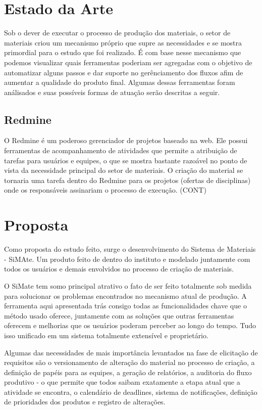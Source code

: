 \section{Estado da Arte}

Sob o dever de executar o processo de produção dos materiais, o setor de materiais criou um mecanismo próprio que supre as necessidades e se mostra primordial para o estudo que foi realizado. É com base nesse mecanismo que podemos visualizar quais ferramentas poderiam ser agregadas com o objetivo de automatizar alguns passos e dar suporte no gerênciamento dos fluxos afim de aumentar a qualidade do produto final. Algumas dessas ferramentas foram análisados e suas possíveis formas de atuação serão descritas a seguir.

\subsection{Redmine}

O Redmine é um poderoso gerenciador de projetos baseado na web. Ele possui ferramentas de acompanhamento de atividades que permite a atribuição de tarefas para usuários e equipes, o que se mostra bastante razoável no ponto de vista da necessidade principal do setor de materiais. O criação do material se tornaria uma tarefa dentro do Redmine para os projetos (ofertas de disciplinas) onde os responsáveis assinariam o processo de execução. (CONT) 

\section{Proposta}

Como proposta do estudo feito, surge o desenvolvimento do Sistema de Materiais - SiMAte. Um produto feito de dentro do instituto e modelado juntamente com todos os usuários e demais envolvidos no processo de criação de materiais.

O SiMate tem somo principal atrativo o fato de ser feito totalmente sob medida para solucionar os problemas encontrados no mecanismo atual de produção. A ferramenta aqui apresentada trás consigo todas as funcionalidades chave que o método usado oferece, juntamente com as soluções que outras ferramentas oferecem e melhorias que os usuários poderam perceber ao longo do tempo. Tudo isso unificado em um sistema totalmente extensível e proprietário.

Algumas das necessidades de mais importância levantados na fase de elicitação de requisitos são o versionamento de alteração do material no processo de criação, a definição de papéis para as equipes, a geração de relatórios, a auditoria do fluxo produtivo - o que permite que todos saibam exatamente a etapa atual que a atividade se encontra, o calendário de deadlines, sistema de notificações, definição de prioridades dos produtos e registro de alterações.

